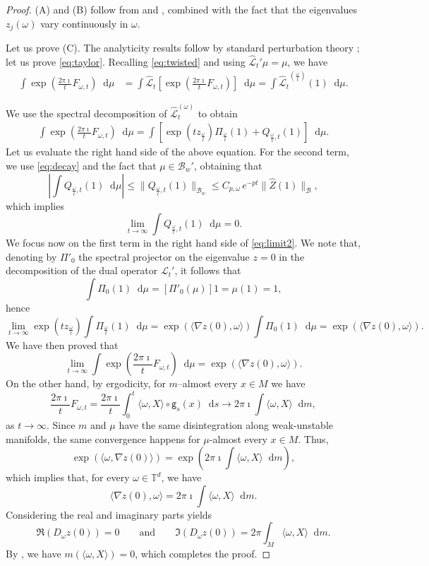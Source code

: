 \documentclass[11pt,letterpaper]{amsart}
\newcommand \cL {{\mathcal L}}
\newcommand \T {{ \mathbb T}}
\newcommand \cB {{\mathscr B}}
\newcommand{\geo}{\mathsf{g}}
\newcommand*{\diff}{\mathop{}\!\mathrm{d}}
\theoremstyle{definition}
\begin{document}
  \begin{proof}
  (A) and (B) follow from  and , combined with the fact that the eigenvalues $z_j(\omega)$ vary continuously in $\omega$.
  
  Let us prove (C). The analyticity results follow by standard perturbation theory \cite{Kat}; let us prove \eqref{eq:taylor}. 
Recalling \eqref{eq:twisted} and using ${\hat\cL_t}'\mu = \mu$, we have 
\[
\begin{split}
\int \exp\left(\frac{2\pi \imath}{t}F_{\omega,t}\right)\diff \mu &=\int {\hat\cL_t}\left[\exp\left(\frac{2\pi \imath}{t}F_{\omega,t}\right)\right] \diff \mu = \int {\hat\cL_t}^{(\frac{\omega}{t})}(1) \diff \mu.
\end{split}
\]

We use the spectral decomposition of $\hat\cL_t^{(\omega)}$ to obtain
\begin{equation}\label{eq:limit2}
\begin{split}
\int \exp\left(\frac{2\pi \imath}{t}F_{\omega,t}\right)\diff \mu  =\int [\exp(tz_{\frac{\omega}{t}})\Pi_{\frac{\omega}{t}}(1)+Q_{\frac{\omega}{t},t}(1)] \diff \mu.
\end{split}
\end{equation}
Let us evaluate the right hand side of the above equation. 
For the second term, we use \eqref{eq:decay} {and the fact that $\mu\in \cB_w'$}, obtaining that
\[
\left| \int Q_{\frac{\omega}{t},t}(1) \diff \mu \right| \le \| Q_{\frac{\omega}{t},t}(1)\|_{\cB_w} \le C_{p,\omega} \,e^{-p t} \|\hat Z(1)\|_{\cB},
\]
which implies  
\[
\lim_{t\to \infty } \int Q_{\frac{\omega}{t},t}(1) \diff \mu =0.
\]
We focus now on the first term in the right hand side of \eqref{eq:limit2}. 
We note that, denoting by $\Pi'_0$ the spectral projector on the eigenvalue $z=0$ in the decomposition of the dual operator $\cL_t'$, it follows that
\[
\int \Pi_{0}(1)\diff \mu=[\Pi'_0(\mu)]1=\mu(1)=1,
\]
hence
\[
\lim_{t\to \infty} \exp(tz_{\frac{\omega}{t}}) \int \Pi_{\frac{\omega}{t}}(1) \diff \mu = \exp(\langle \nabla z(0), \omega \rangle) \int \Pi_{0}(1) \diff \mu = \exp(\langle \nabla z(0), \omega \rangle).
\]
We have then proved that 
\[
\lim_{t\to \infty} \int \exp\left(\frac{2\pi \imath}{t}F_{\omega,t}\right) \diff \mu  = \exp(\langle \nabla z(0), \omega \rangle).
\]
On the other hand, by ergodicity, for $m$--almost every $x \in M$ we have
\[
\frac{2\pi \imath}{t}F_{\omega,t} = \frac{2\pi \imath}{t}  \int_0^t \langle \omega, X \rangle\circ \geo_{s}(x) \diff s \to 2\pi \imath \int \langle \omega, X \rangle \diff m,
\]
as $t \to \infty$. 
Since $m$ and $\mu$ have the same disintegration along weak-unstable manifolds, the same convergence happens for $\mu$-almost every $x \in M$. 
Thus, 
\[
\exp(\langle \omega, \nabla z(0)\rangle) = \exp\left(  2\pi \imath \int \langle \omega, X \rangle \diff m \right),
\]
which implies that, for every $\omega \in \T^d$, we have
\[
\langle \nabla z(0), \omega \rangle =  2\pi \imath \int \langle \omega, X \rangle \diff m.
\]
Considering the real and imaginary parts yields 
\[
\Re(D_{\omega}z(0))=0 \qquad \text{and} \qquad \Im(D_{\omega} z(0))=2\pi \int_M \langle \omega, X \rangle \diff m.
\]
By \cite{KatSun}, we have $m( \langle \omega, X \rangle)=0$, which completes the proof.


\end{proof}
\end{document}

